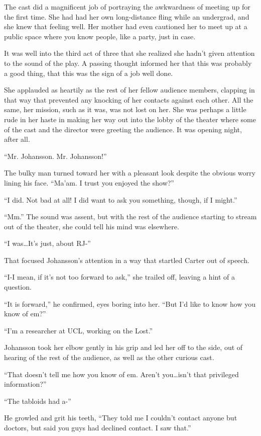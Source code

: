 The cast did a magnificent job of portraying the awkwardness of meeting up for the first time.  She had had her own long-distance fling while an undergrad, and she knew that feeling well.  Her mother had even cautioned her to meet up at a public space where you know people, like a party, just in case.

It was well into the third act of three that she realized she hadn't given attention to the sound of the play.  A passing thought informed her that this was probably a good thing, that this was the sign of a job well done.

She applauded as heartily as the rest of her fellow audience members, clapping in that way that prevented any knocking of her contacts against each other.  All the same, her mission, such as it was, was not lost on her.  She was perhaps a little rude in her haste in making her way out into the lobby of the theater where some of the cast and the director were greeting the audience.  It was opening night, after all.

``Mr. Johansson.  Mr. Johansson!''

The bulky man turned toward her with a pleasant look despite the obvious worry lining his face.  ``Ma'am.  I trust you enjoyed the show?''

``I did.  Not bad at all!  I did want to ask you something, though, if I might.''

``Mm.''  The sound was assent, but with the rest of the audience starting to stream out of the theater, she could tell his mind was elsewhere.

``I was\ldots{}It's just, about RJ-''

That focused Johansson's attention in a way that startled Carter out of speech.

``I-I mean, if it's not too forward to ask,'' she trailed off, leaving a hint of a question.

``It is forward,'' he confirmed, eyes boring into her.  ``But I'd like to know how you know of em?''

``I'm a researcher at UCL, working on the Lost.''

Johansson took her elbow gently in his grip and led her off to the side, out of hearing of the rest of the audience, as well as the other curious cast.

``That doesn't tell me how you know of em.  Aren't you\ldots{}isn't that privileged information?''

``The tabloids had a-''

He growled and grit his teeth, ``They told me I couldn't contact anyone but doctors, but said you guys had declined contact.  I saw that.''

